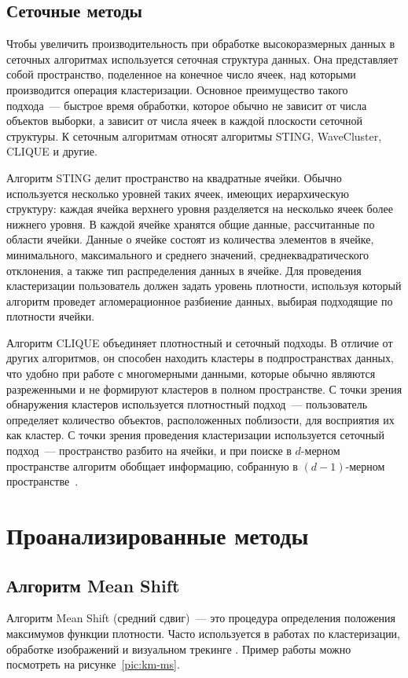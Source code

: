 \subsection{Сеточные методы}
Чтобы увеличить производительность при обработке высокоразмерных данных в сеточных алгоритмах используется сеточная структура данных. Она представляет собой пространство, поделенное на конечное число ячеек, над которыми производится операция кластеризации. Основное преимущество такого подхода~--- быстрое время обработки, которое обычно не зависит от числа объектов выборки, а зависит от числа ячеек в каждой плоскости сеточной структуры. К сеточным алгоритмам относят алгоритмы STING, WaveCluster, CLIQUE и другие.

Алгоритм STING делит пространство на квадратные ячейки. Обычно используется несколько уровней таких ячеек, имеющих иерархическую структуру: каждая ячейка верхнего уровня разделяется на несколько ячеек более нижнего уровня. В каждой ячейке хранятся общие данные, рассчитанные по области ячейки. Данные о ячейке состоят из количества элементов в ячейке, минимального, максимального и среднего значений, среднеквадратического отклонения, а также тип распределения данных в ячейке. Для проведения кластеризации пользователь должен задать уровень плотности, используя который алгоритм проведет агломерационное разбиение данных, выбирая подходящие по плотности ячейки.

Алгоритм CLIQUE объединяет плотностный и сеточный подходы. В отличие от других алгоритмов, он способен находить кластеры в подпространствах данных, что удобно при работе с многомерными данными, которые обычно являются разреженными и не формируют кластеров в полном пространстве. С точки зрения обнаружения кластеров используется плотностный подход~--- пользователь определяет количество объектов, расположенных поблизости, для восприятия их как кластер. С точки зрения проведения кластеризации используется сеточный подход~--- пространство разбито на ячейки, и при поиске в \( d \)-мерном пространстве алгоритм обобщает информацию, собранную в \( (d - 1) \)-мерном пространстве~\cite{cod}.

\section{Проанализированные методы}
\subsection{Алгоритм Mean Shift}
Алгоритм Mean Shift (средний сдвиг)~--- это процедура определения положения максимумов функции плотности. Часто используется в работах по кластеризации, обработке изображений и визуальном трекинге \cite{ms, meanshift}. Пример работы можно посмотреть на рисунке~\ref{pic:km-ms}.

